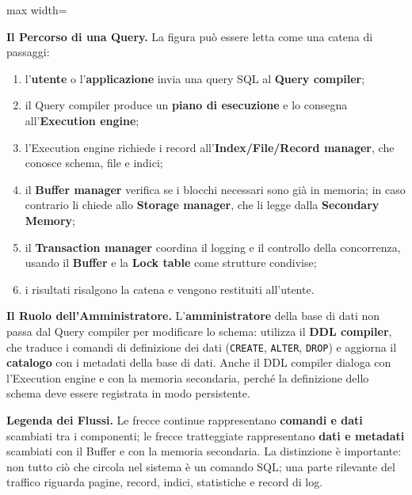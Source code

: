 \documentclass[12pt]{extarticle}
\begin{document}
\begin{center}
\begin{adjustbox}{max width=\linewidth}
\end{adjustbox}
\end{center}

\noindent \textbf{Il Percorso di una Query.} La figura può essere letta come una catena di passaggi:
\begin{enumerate}
    \item l'\textbf{utente} o l'\textbf{applicazione} invia una query SQL al \textbf{Query compiler};
    \item il Query compiler produce un \textbf{piano di esecuzione} e lo consegna all'\textbf{Execution engine};
    \item l'Execution engine richiede i record all'\textbf{Index/File/Record manager}, che conosce schema, file e indici;
    \item il \textbf{Buffer manager} verifica se i blocchi necessari sono già in memoria; in caso contrario li chiede allo \textbf{Storage manager}, che li legge dalla \textbf{Secondary Memory};
    \item il \textbf{Transaction manager} coordina il logging e il controllo della concorrenza, usando il \textbf{Buffer} e la \textbf{Lock table} come strutture condivise;
    \item i risultati risalgono la catena e vengono restituiti all'utente.
\end{enumerate}

\medskip
\noindent \textbf{Il Ruolo dell'Amministratore.} L'\textbf{amministratore} della base di dati non passa dal Query compiler per modificare lo schema: utilizza il \textbf{DDL compiler}, che traduce i comandi di definizione dei dati (\texttt{CREATE}, \texttt{ALTER}, \texttt{DROP}) e aggiorna il \textbf{catalogo} con i metadati della base di dati. Anche il DDL compiler dialoga con l'Execution engine e con la memoria secondaria, perché la definizione dello schema deve essere registrata in modo persistente.

\medskip
\noindent \textbf{Legenda dei Flussi.} Le frecce continue rappresentano \textbf{comandi e dati} scambiati tra i componenti; le frecce tratteggiate rappresentano \textbf{dati e metadati} scambiati con il Buffer e con la memoria secondaria. La distinzione è importante: non tutto ciò che circola nel sistema è un comando SQL; una parte rilevante del traffico riguarda pagine, record, indici, statistiche e record di log.
\end{document}
